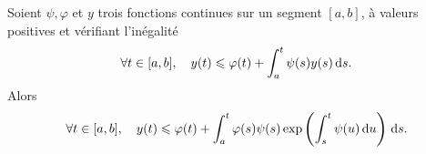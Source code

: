 \begin{lemme}
    Soient $\psi, \varphi$ et $y$ trois fonctions continues sur un segment $[a, b]$, à valeurs positives et vérifiant l'inégalité 
    $$\forall t \in [a, b], \quad y(t) \leqslant \varphi(t) + \int_{a}^{t} \psi(s) y(s) \, \mathrm{d} s.$$
    Alors
    $$ \forall t \in [a, b], \quad y(t) \leqslant \varphi(t) + \int_{a}^{t} \varphi(s) \psi(s) \exp \left( \int_{s}^{t} \psi(u) \, \mathrm{d} u \right) \, \mathrm{d} s.$$
\end{lemme}